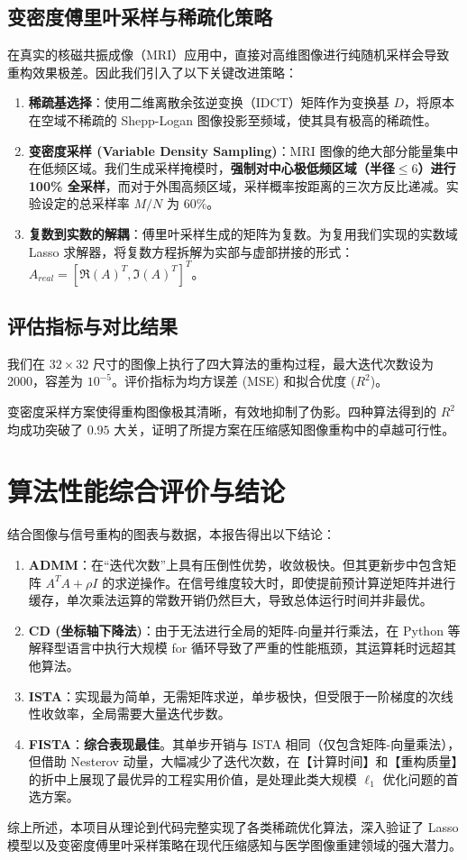 \documentclass[12pt, a4paper]{ctexart}
\begin{document}
\subsection{变密度傅里叶采样与稀疏化策略}
在真实的核磁共振成像（MRI）应用中，直接对高维图像进行纯随机采样会导致重构效果极差。因此我们引入了以下关键改进策略：
\begin{enumerate}
    \item \textbf{稀疏基选择}：使用二维离散余弦逆变换（IDCT）矩阵作为变换基 $D$，将原本在空域不稀疏的 Shepp-Logan 图像投影至频域，使其具有极高的稀疏性。
    \item \textbf{变密度采样 (Variable Density Sampling)}：MRI 图像的绝大部分能量集中在低频区域。我们生成采样掩模时，\textbf{强制对中心极低频区域（半径$\le 6$）进行 100\% 全采样}，而对于外围高频区域，采样概率按距离的三次方反比递减。实验设定的总采样率 $M/N$ 为 $60\%$。
    \item \textbf{复数到实数的解耦}：傅里叶采样生成的矩阵为复数。为复用我们实现的实数域 Lasso 求解器，将复数方程拆解为实部与虚部拼接的形式：$A_{real} = [\Re(A)^T, \Im(A)^T]^T$。
\end{enumerate}

\subsection{评估指标与对比结果}
我们在 $32 \times 32$ 尺寸的图像上执行了四大算法的重构过程，最大迭代次数设为 2000，容差为 $10^{-5}$。评价指标为均方误差 (MSE) 和拟合优度 ($R^2$)。

变密度采样方案使得重构图像极其清晰，有效地抑制了伪影。四种算法得到的 $R^2$ 均成功突破了 $0.95$ 大关，证明了所提方案在压缩感知图像重构中的卓越可行性。

\section{算法性能综合评价与结论}
结合图像与信号重构的图表与数据，本报告得出以下结论：
\begin{enumerate}
    \item \textbf{ADMM}：在“迭代次数”上具有压倒性优势，收敛极快。但其更新步中包含矩阵 $A^TA + \rho I$ 的求逆操作。在信号维度较大时，即使提前预计算逆矩阵并进行缓存，单次乘法运算的常数开销仍然巨大，导致总体运行时间并非最优。
    \item \textbf{CD (坐标轴下降法)}：由于无法进行全局的矩阵-向量并行乘法，在 Python 等解释型语言中执行大规模 for 循环导致了严重的性能瓶颈，其运算耗时远超其他算法。
    \item \textbf{ISTA}：实现最为简单，无需矩阵求逆，单步极快，但受限于一阶梯度的次线性收敛率，全局需要大量迭代步数。
    \item \textbf{FISTA}：\textbf{综合表现最佳}。其单步开销与 ISTA 相同（仅包含矩阵-向量乘法），但借助 Nesterov 动量，大幅减少了迭代次数，在【计算时间】和【重构质量】的折中上展现了最优异的工程实用价值，是处理此类大规模 $\ell_1$ 优化问题的首选方案。
\end{enumerate}

综上所述，本项目从理论到代码完整实现了各类稀疏优化算法，深入验证了 Lasso 模型以及变密度傅里叶采样策略在现代压缩感知与医学图像重建领域的强大潜力。
\end{document}
